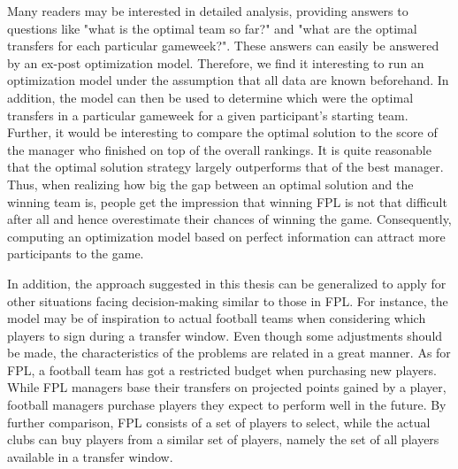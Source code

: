 
\newpar

Many readers may be interested in detailed analysis, providing answers to questions like "what is the optimal team so far?" and "what are the optimal transfers for each particular gameweek?". These answers can easily be answered by an ex-post optimization model. Therefore, we find it interesting to run an optimization model under the assumption that all data are known beforehand. In addition, the model can then be used to determine which were the optimal transfers in a particular gameweek for a given participant's starting team. Further, it would be interesting to compare the optimal solution to the score of the manager who finished on top of the overall rankings. It is quite reasonable that the optimal solution strategy largely outperforms that of the best manager. Thus, when realizing how big the gap between an optimal solution and the winning team is, people get the impression that winning FPL is not that difficult after all and hence overestimate their chances of winning the game. Consequently, computing an optimization model based on perfect information can attract more participants to the game.

\newpar

In addition, the approach suggested in this thesis can be generalized to apply for other situations facing decision-making similar to those in FPL. For instance, the model may be of inspiration to actual football teams when considering which players to sign during a transfer window. Even though some adjustments should be made, the characteristics of the problems are related in a great manner. As for FPL, a football team has got a restricted budget when purchasing new players. While FPL managers base their transfers on projected points gained by a player, football managers purchase players they expect to perform well in the future. By further comparison, FPL consists of a set of players to select, while the actual clubs can buy players from a similar set of players, namely the set of all players available in a transfer window.

\newpar

